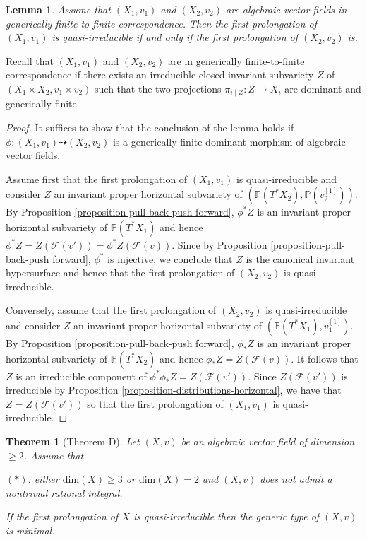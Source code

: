 \documentclass[12pt]{amsart}
\renewcommand{\P}{\mathbb{P}}
\theoremstyle{definition}
\theoremstyle{plain}
\newtheorem{theorem}[definition]{Theorem}
\newtheorem{lemma}[definition]{Lemma}
\theoremstyle{exampstyle}
\theoremstyle{exampstyle}\newtheorem{thmxbis}{Theorem}
\numberwithin{equation}{section}
\theoremstyle{remark}
\begin{document}
\begin{lemma} \label{finitetofinite correspondence}
Assume that $(X_1,v_1)$ and $(X_2,v_2)$ are algebraic vector fields in generically finite-to-finite correspondence. Then the first prolongation of $(X_1,v_1)$ is quasi-irreducible if and only if the first prolongation of $(X_2,v_2)$ is. 
\end{lemma} 

Recall that $(X_1,v_1)$ and $(X_2,v_2)$ are in generically finite-to-finite correspondence if there exists an irreducible closed invariant subvariety $Z$ of $(X_1\times X_2, v_1 \times v_2)$ such that the two projections
$\pi_{i \mid Z}: Z \rightarrow X_i $
are dominant and generically finite. 
\begin{proof} 
It suffices to show that the conclusion of the lemma holds if $\phi : (X_1,v_1) \dashrightarrow (X_2,v_2)$ is a generically finite dominant morphism of algebraic vector fields. 


Assume first that the first prolongation of  $(X_1,v_1)$ is quasi-irreducible and consider $Z$ an invariant proper horizontal subvariety of $(\P(T^\ast X_2), \P(v^{[1]}_2))$. By Proposition \ref{proposition-pull-back-push forward}, $\phi^\ast Z$ is an invariant proper horizontal subvariety of $\P(T^\ast X_1)$ and hence $\phi^\ast Z = Z(\mathcal F(v')) = \phi^\ast Z(\mathcal F(v)).$
Since by Proposition \ref{proposition-pull-back-push forward}, $\phi^\ast$ is injective, we conclude that $Z$ is the canonical invariant hypersurface and hence that the first prolongation of $(X_2,v_2)$ is quasi-irreducible.

Conversely, assume that the first prolongation of $(X_2,v_2)$ is quasi-irreducible and consider $Z$ an invariant proper horizontal subvariety of  $(\P(T^\ast X_1),v_1^{[1]})$. By Proposition \ref{proposition-pull-back-push forward}, $\phi_\ast Z$ is an invariant proper horizontal subvariety of $\P(T^\ast X_2)$ and hence $\phi_\ast Z = Z(\mathcal F(v))$. 
It follows that $Z$ is an irreducible component of 
$\phi^\ast \phi_\ast Z = Z(\mathcal F(v'))$. Since $Z(\mathcal F(v'))$ is irreducible by Proposition \ref{proposition-distributions-horizontal}, we have that $Z  = Z(\mathcal F(v'))$ so that the first prolongation of $(X_1,v_1)$ is quasi-irreducible. 
 \end{proof} 
\begin{theorem}[Theorem D] \label{theorem-minimality}
Let $(X,v)$ be an algebraic vector field of dimension $\geq 2$.  Assume that
\begin{center} 
$(\ast)$: either $\mathrm{dim}(X) \geq 3$ or $\mathrm{dim}(X) = 2$ and $(X,v)$ does not admit a nontrivial rational integral. 
\end{center}
If the first prolongation of $X$ is quasi-irreducible then the generic type of $(X,v)$ is minimal. 
\end{theorem} 
\end{document}
